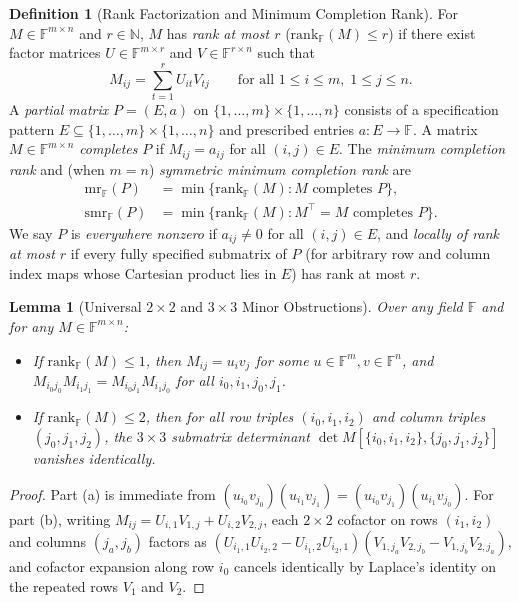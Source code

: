 \documentclass[11pt]{article}
\newtheorem{lemma}[theorem]{Lemma}
\theoremstyle{definition}
\newtheorem{definition}[theorem]{Definition}
\newcommand{\F}{\mathbb{F}}
\newcommand{\mr}{\mathrm{mr}}
\newcommand{\smr}{\mathrm{smr}}
\newcommand{\rk}{\mathrm{rank}}
\begin{document}
\begin{definition}[Rank Factorization and Minimum Completion Rank]
For $M \in \F^{m\times n}$ and $r \in \mathbb{N}$, $M$ has \emph{rank at most $r$} ($\rk_{\F}(M) \le r$) if there exist factor matrices $U \in \F^{m\times r}$ and $V \in \F^{r\times n}$ such that
\[
M_{ij} = \sum_{t=1}^{r} U_{it} V_{tj} \qquad \text{for all } 1 \le i \le m,\; 1 \le j \le n.
\]
A \emph{partial matrix} $P = (E, a)$ on $\{1,\dots,m\}\times\{1,\dots,n\}$ consists of a specification pattern $E \subseteq \{1,\dots,m\}\times\{1,\dots,n\}$ and prescribed entries $a : E \to \F$. A matrix $M \in \F^{m\times n}$ \emph{completes} $P$ if $M_{ij} = a_{ij}$ for all $(i,j) \in E$. The \emph{minimum completion rank} and (when $m=n$) \emph{symmetric minimum completion rank} are
\begin{align*}
\mr_{\F}(P) &= \min\{\rk_{\F}(M) : M \text{ completes } P\}, \\
\smr_{\F}(P) &= \min\{\rk_{\F}(M) : M^\top = M \text{ completes } P\}.
\end{align*}
We say $P$ is \emph{everywhere nonzero} if $a_{ij} \neq 0$ for all $(i,j)\in E$, and \emph{locally of rank at most $r$} if every fully specified submatrix of $P$ (for arbitrary row and column index maps whose Cartesian product lies in $E$) has rank at most $r$.
\end{definition}

\begin{lemma}[Universal $2\times 2$ and $3\times 3$ Minor Obstructions]\label{lem:minors}
Over any field $\F$ and for any $M \in \F^{m\times n}$:
\begin{itemize}
\item[(a)] If $\rk_{\F}(M) \le 1$, then $M_{ij} = u_i v_j$ for some $u \in \F^m, v \in \F^n$, and $M_{i_0 j_0} M_{i_1 j_1} = M_{i_0 j_1} M_{i_1 j_0}$ for all $i_0,i_1,j_0,j_1$.
\item[(b)] If $\rk_{\F}(M) \le 2$, then for all row triples $(i_0,i_1,i_2)$ and column triples $(j_0,j_1,j_2)$, the $3\times 3$ submatrix determinant $\det M[\{i_0,i_1,i_2\},\{j_0,j_1,j_2\}]$ vanishes identically.
\end{itemize}
\end{lemma}
\begin{proof}
Part (a) is immediate from $(u_{i_0} v_{j_0})(u_{i_1} v_{j_1}) = (u_{i_0} v_{j_1})(u_{i_1} v_{j_0})$. For part (b), writing $M_{ij} = U_{i,1} V_{1,j} + U_{i,2} V_{2,j}$, each $2\times 2$ cofactor on rows $(i_1,i_2)$ and columns $(j_a,j_b)$ factors as $(U_{i_1,1} U_{i_2,2} - U_{i_1,2} U_{i_2,1})(V_{1,j_a} V_{2,j_b} - V_{1,j_b} V_{2,j_a})$, and cofactor expansion along row $i_0$ cancels identically by Laplace's identity on the repeated rows $V_1$ and $V_2$.
\end{proof}
\end{document}
